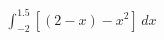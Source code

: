 \documentclass[preview]{standalone}
\begin{document}
\begin{align*}
\int_{-2}^{1.5} \left[ (2 - x) - x^2 \right] \, dx
\end{align*}
\end{document}
